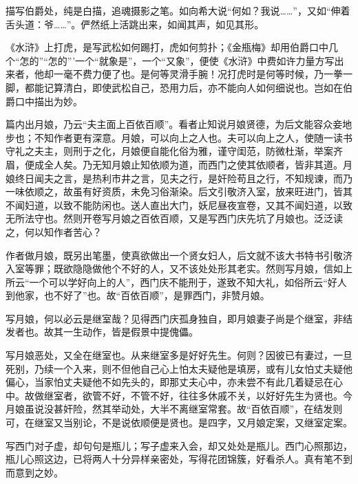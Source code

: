 \begin{showcontents}{}
{描写伯爵处，纯是白描，追魂摄影之笔。如向希大说“何如？我说……”，又如“伸着舌头道：爷……”。俨然纸上活跳出来，如闻其声，如见其形。

《水浒》上打虎，是写武松如何踢打，虎如何剪扑；《金瓶梅》却用伯爵口中几个“怎的”“怎的”’一个“就象是”，一个“又象”，便使《水浒》中费如许力量方写出来者，他却一毫不费力便了也。是何等灵滑手腕！况打虎时是何等时候，乃一拳一脚，都能记算清白，即使武松自己，恐用力后，亦不能向人如何细说也。岂如在伯爵口中描出为妙。

篇内出月娘，乃云“夫主面上百依百顺”。看者止知说月娘贤德，为后文能容众妾地步也；不知作者更有深意。月娘，可以向上之人也。夫可以向上之人，使随一读书守礼之夫主，则刑于之化，月娘便自能化俗为雅，谨守闺范，防微杜渐，举案齐眉，便成全人矣。乃无知月娘止知依顺为道，而西门之使其依顺者，皆非其道。月娘终日闻夫之言，是热利市井之言，见夫之行，是奸险苟且之行，不知规谏，而乃一味依顺之，故虽有好资质，未免习俗渐染。后文引敬济入室，放来旺进门，皆其不闻妇道，以致不能防闲也。送人直出大门，妖尼昼夜宣卷，又其不闻妇道，以致无所法守也。然则开卷写月娘之百依百顺，又是写西门庆先坑了月娘也。泛泛读之，何以知作者苦心？

作者做月娘，既另出笔墨，使真欲做出一个贤女妇人，后文就不该大书特书引敬济入室等罪；既欲隐隐做他个不好的人，又不该处处形其老实。然则写月娘，信如上所云“一个可以学好向上的人”，西门庆不能刑于，遂致不知大礼，如俗所云“好人到他家，也不好了”也。故“百依百顺”，是罪西门，非赞月娘。

写月娘，何以必云是继室哉？见得西门庆孤身独自，即月娘妻子尚是个继室，非结发者也。故其一生动作，皆是假景中提傀儡。

写月娘恶处，又全在继室也。从来继室多是好好先生。何则？因彼已有妻过，一旦死别，乃续一个入来，则不但他自己心上怕太夫疑他是填房，或有儿女怕丈夫疑他偏心，当家怕丈夫疑他不如先头的，即那丈夫心中，亦未尝不有此几着疑忌在心中。故做继室者，欲管不好，不管不好，往往多休戚不关，以好好先生为贤也。今月娘虽说没甚奸险，然其举动处，大半不离继室常套。故“百依百顺”，在结发则可，在继室又当别论，不是说依顺便是贤也。是四字，又月娘定案，又继室定案。

写西门对子虚，却句句是瓶儿；写子虚来入会，却又处处是瓶儿。西门心照那边，瓶儿心照这边，已将两人十分异样亲密处，写得花团锦簇，好看杀人。真有笔不到而意到之妙。

}
\end{showcontents}
